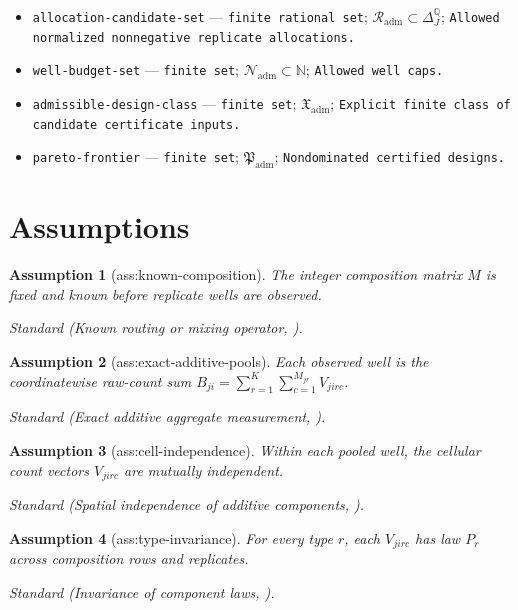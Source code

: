 \documentclass{article}
\newtheorem{assumption}{Assumption}
\begin{document}
\begin{itemize}
  \item \texttt{allocation-\allowbreak{}candidate-\allowbreak{}set} --- \texttt{finite rational set}; \(\mathcal R_{\mathrm{adm}}\subset\Delta_J^{\mathbb Q}\); \texttt{Allowed normalized nonnegative replicate allocations.}
  \item \texttt{well-\allowbreak{}budget-\allowbreak{}set} --- \texttt{finite set}; \(\mathcal N_{\mathrm{adm}}\subset\mathbb N\); \texttt{Allowed well caps.}
  \item \texttt{admissible-\allowbreak{}design-\allowbreak{}class} --- \texttt{finite set}; \(\mathfrak X_{\mathrm{adm}}\); \texttt{Explicit finite class of candidate certificate inputs.}
  \item \texttt{pareto-\allowbreak{}frontier} --- \texttt{finite set}; \(\mathfrak P_{\mathrm{adm}}\); \texttt{Nondominated certified designs.}
\end{itemize}

\section{Assumptions}

\begin{assumption}[ass:known-composition]\label{ass:known-composition}
The integer composition matrix \(M\) is fixed and known before replicate wells are observed.
\par\smallskip\noindent\emph{Standard} (Known routing or mixing operator, \cite{ShihHero2001Unicast}).
\end{assumption}

\begin{assumption}[ass:exact-additive-pools]\label{ass:exact-additive-pools}
Each observed well is the coordinatewise raw-count sum \(B_{ji}=\sum_{r=1}^{K}\sum_{c=1}^{M_{jr}}V_{jirc}\).
\par\smallskip\noindent\emph{Standard} (Exact additive aggregate measurement, \cite{ShihHero2001Unicast}).
\end{assumption}

\begin{assumption}[ass:cell-independence]\label{ass:cell-independence}
Within each pooled well, the cellular count vectors \(V_{jirc}\) are mutually independent.
\par\smallskip\noindent\emph{Standard} (Spatial independence of additive components, \cite{ShihHero2001Unicast}).
\end{assumption}

\begin{assumption}[ass:type-invariance]\label{ass:type-invariance}
For every type \(r\), each \(V_{jirc}\) has law \(P_r\) across composition rows and replicates.
\par\smallskip\noindent\emph{Standard} (Invariance of component laws, \cite{ShihHero2001Unicast}).
\end{assumption}
\end{document}

